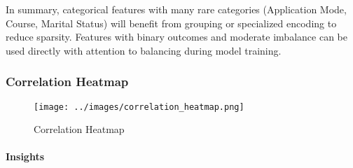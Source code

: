 \documentclass[twoside,final]{hcmut-report}
\begin{document}
In summary, categorical features with many rare categories (Application Mode, Course, Marital Status) will benefit from grouping or specialized encoding to reduce sparsity. Features with binary outcomes and moderate imbalance can be used directly with attention to balancing during model training.

\subsubsection{Correlation Heatmap}
\begin{figure}[H]
  \centering
  \texttt{[image: ../images/correlation\_heatmap.png]}
  \caption{Correlation Heatmap}
  \label{core_heat}
\end{figure}
\paragraph{Insights}
\end{document}
